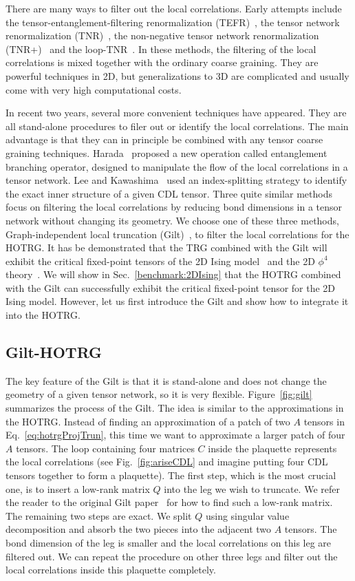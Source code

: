 \documentclass[aps,prb,reprint,superscriptaddress]{revtex4-2}
\begin{document}
There are many ways to filter out the local correlations. Early attempts
include the tensor-entanglement-filtering renormalization
(TEFR)~\cite{GuWen2009}, the tensor network renormalization
(TNR)~\cite{tnr,tnralgo}, the non-negative tensor network
renormalization (TNR+)~\cite{tnrplus} and the loop-TNR~\cite{looptnr}.
In these methods, the filtering of the local correlations is mixed
together with the ordinary coarse graining. They are powerful techniques
in 2D, but generalizations to 3D are complicated and usually come with
very high computational costs. 
%

In recent two years, several more convenient techniques have appeared.
They are all stand-alone procedures to filer out or identify the local
correlations.  The main advantage is that they can in principle be
combined with any tensor coarse graining techniques.
Harada~\cite{harada2018} proposed a new operation called entanglement
branching operator, designed to manipulate the flow of the local
correlations in a tensor network. Lee and Kawashima~\cite{tensor-ring}
used an index-splitting strategy to identify the exact inner structure
of a given CDL tensor. Three quite similar methods~\cite{tns,gilts,fet}
focus on filtering the local correlations by reducing bond dimensions in
a tensor network without changing its geometry. We choose one of these
three methods, Graph-independent local truncation (Gilt)~\cite{gilts},
to filter the local correlations for the HOTRG. It has be demonstrated
that the TRG combined with the Gilt will exhibit the critical
fixed-point tensors of the 2D Ising model~\cite{gilts} and the 2D
$\phi^4$ theory~\cite{Delcamp2020}. We will show in
Sec.~\ref{benchmark:2DIsing} that the HOTRG combined with the Gilt can
successfully exhibit the critical fixed-point tensor for the 2D Ising
model.  However, let us first introduce the Gilt and show how to
integrate it into the HOTRG.
%

\subsection{Gilt-HOTRG\label{gilt-hotrg}}
The key feature of the Gilt is that it is stand-alone and does not
change the geometry of a given tensor network, so it is very flexible.
Figure~\ref{fig:gilt} summarizes the process of the Gilt. The idea is
similar to the approximations in the HOTRG. Instead of finding an
approximation of a patch of two $A$ tensors in
Eq.~\eqref{eq:hotrgProjTrun}, this time we want to approximate a larger
patch of four $A$ tensors. The loop containing four matrices $C$ inside
the plaquette represents the local correlations (see
Fig.~\ref{fig:ariseCDL} and imagine putting four CDL tensors together to
form a plaquette). The first step, which is the most crucial one, is to
insert a low-rank matrix $Q$ into the leg we wish to truncate. We refer
the reader to the original Gilt paper~\cite{gilts} for how to find such
a low-rank matrix. The remaining two steps are exact. We split $Q$ using
singular value decomposition and absorb the two pieces into the adjacent
two $A$ tensors. The bond dimension of the leg is smaller and the local
correlations on this leg are filtered out. We can repeat the procedure
on other three legs and filter out the local correlations inside this
plaquette completely.
%
\end{document}
